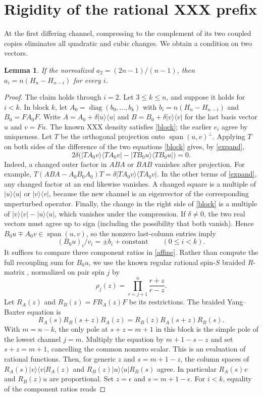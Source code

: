 \documentclass[11pt]{article}
\newtheorem{lemma}[theorem]{Lemma}
\newcommand{\pr}[1]{|#1\rangle\langle#1|}
\DeclareMathOperator{\diag}{diag}
\begin{document}
\section{Rigidity of the rational XXX prefix}\label{rational}
At the first differing channel, compressing to the complement of its two coupled copies eliminates all quadratic and cubic changes. We obtain a condition on two vectors.
\begin{lemma}\label{xxx}
If the normalized $a_2=(2n-1)/(n-1)$, then $a_i=n(H_n-H_{n-i})$ for every $i$.
\end{lemma}
\begin{proof}
The claim holds through $i=2$. Let $3\le k\le n$, and suppose it holds for $i<k$. In block $k$, let $A_0=\diag(b_0,\ldots,b_k)$ with $b_i=n(H_n-H_{n-i})$ and $B_0=FA_0F$. Write $A=A_0+\delta\pr{u}$ and $B=B_0+\delta\pr{v}$ for the last basis vector $u$ and $v=Fu$. The known XXX density satisfies \eqref{block}; the earlier $e_i$ agree by uniqueness. Let $T$ be the orthogonal projection onto $\operatorname{span}(u,v)^\perp$. Applying $T$ on both sides of the difference of the two equations \eqref{block} gives, by \eqref{expand},
\[
 2\delta\bigl(\pr{TA_0v}-\pr{TB_0u}\bigr)=0.
\]
Indeed, a changed outer factor in $ABA$ or $BAB$ vanishes after projection. For example, $T(ABA-A_0B_0A_0)T=\delta\pr{TA_0v}$. In the other terms of \eqref{expand}, any changed factor at an end likewise vanishes. A changed square is a multiple of $\pr{u}$ or $\pr{v}$, because the new channel is an eigenvector of the corresponding unperturbed operator. Finally, the change in the right side of \eqref{block} is a multiple of $\pr{v}-\pr{u}$, which vanishes under the compression. If $\delta\ne0$, the two real vectors must agree up to sign (including the possibility that both vanish). Hence $B_0u\mp A_0v\in\operatorname{span}(u,v)$, so the nonzero last-column entries imply
\begin{equation}\label{affine}
 (B_0u)_i/v_i=\pm b_i+\text{constant}\qquad(0\le i<k).
\end{equation}
It suffices to compare three component ratios in \eqref{affine}. Rather than compute the full recoupling sum for $B_0u$, we use the known regular rational spin-$S$ braided $R$-matrix \cite{Bytsko1,KRS}, normalized on pair spin $j$ by
\[
 \rho_j(z)=\prod_{r=j+1}^n\frac{r+z}{r-z}.
\]
Let $R_A(z)$ and $R_B(z)=FR_A(z)F$ be its restrictions. The braided Yang--Baxter equation is
\[
 R_A(s)R_B(s+z)R_A(z)=R_B(z)R_A(s+z)R_B(s).
\]
With $m=n-k$, the only pole at $s+z=m+1$ in this block is the simple pole of the lowest channel $j=m$. Multiply the equation by $m+1-s-z$ and set $s+z=m+1$, cancelling the common nonzero scalar. This is an evaluation of rational functions. Then, for generic $z$ and $s=m+1-z$, the column spaces of $R_A(s)\pr{v}R_A(z)$ and $R_B(z)\pr{u}R_B(s)$ agree. In particular $R_A(s)v$ and $R_B(z)u$ are proportional. Set $z=\epsilon$ and $s=m+1-\epsilon$. For $i<k$, equality of the component ratios reads

\end{proof}
\end{document}
